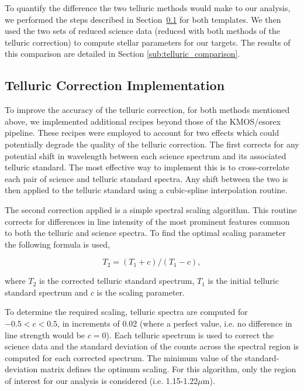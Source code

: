 \documentclass[iop]{emulateapj}
\begin{document}
To quantify the difference the two telluric methods would make to our analysis,
we performed the steps described in
Section~\ref{sub:ngc6822_telluric_correction} for both templates.
We then used the two sets of reduced science data
(reduced with both methods of the telluric correction) to compute stellar parameters for our targets.
The results of this comparison are detailed in Section
\ref{sub:telluric_comparison}.


\subsection{Telluric Correction Implementation} %
\label{sub:ngc6822_telluric_correction}

To improve the accuracy of the telluric correction,
for both methods mentioned above,
we implemented additional recipes beyond those of the KMOS/esorex pipeline.
These recipes were employed to account for two effects which could potentially degrade the quality of the telluric correction.
The first corrects for any potential shift in wavelength between each science spectrum and its associated telluric standard.
The most effective way to implement this is to cross-correlate each pair of science and telluric standard spectra.
Any shift between the two is then applied to the telluric standard using a cubic-spline interpolation routine.

The second correction applied is a simple spectral scaling algorithm.
This routine corrects for differences in line intensity of the most prominent features common to both the telluric and science spectra.
To find the optimal scaling parameter the following formula is used,

\begin{equation} \label{eq:shiftandres}
T_{2} = (T_{1} + c) / (T_{1} - c),
\end{equation}

\noindent where $T_{2}$ is the corrected telluric standard spectrum,
$T_{1}$ is the initial telluric standard spectrum and $c$ is the scaling parameter.

To determine the required scaling,
telluric spectra are computed for $-0.5 < c < 0.5$, in increments of 0.02
(where a perfect value, i.e. no difference in line strength would be $c = 0$).
Each telluric spectrum is used to correct the science data and the standard deviation of the counts across the spectral region is computed for each corrected spectrum.
The minimum value of the standard-deviation matrix defines the optimum scaling.
For this algorithm, only the region of interest for our analysis is considered
(i.e. 1.15-1.22$\mu$m).
\end{document}
